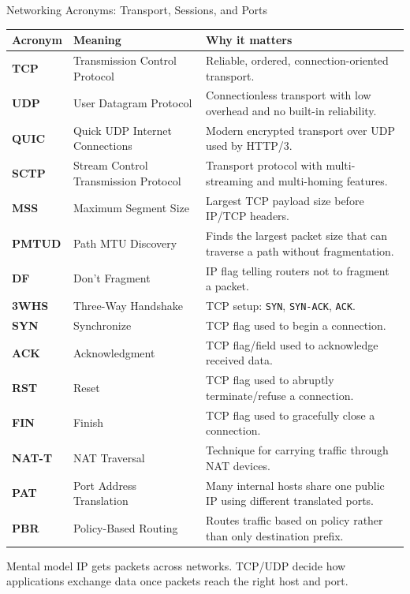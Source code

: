 \documentclass[aspectratio=169]{beamer}
\begin{document}
\begin{frame}{Networking Acronyms: Transport, Sessions, and Ports}
\tiny

\begin{tabular}{p{1.8cm} p{3.7cm} p{6.7cm}}
\toprule
\textbf{Acronym} & \textbf{Meaning} & \textbf{Why it matters} \\
\midrule
\textbf{TCP} & Transmission Control Protocol & Reliable, ordered, connection-oriented transport. \\
\textbf{UDP} & User Datagram Protocol & Connectionless transport with low overhead and no built-in reliability. \\
\textbf{QUIC} & Quick UDP Internet Connections & Modern encrypted transport over UDP used by HTTP/3. \\
\textbf{SCTP} & Stream Control Transmission Protocol & Transport protocol with multi-streaming and multi-homing features. \\
\textbf{MSS} & Maximum Segment Size & Largest TCP payload size before IP/TCP headers. \\
\textbf{PMTUD} & Path MTU Discovery & Finds the largest packet size that can traverse a path without fragmentation. \\
\textbf{DF} & Don't Fragment & IP flag telling routers not to fragment a packet. \\
\textbf{3WHS} & Three-Way Handshake & TCP setup: \texttt{SYN}, \texttt{SYN-ACK}, \texttt{ACK}. \\
\textbf{SYN} & Synchronize & TCP flag used to begin a connection. \\
\textbf{ACK} & Acknowledgment & TCP flag/field used to acknowledge received data. \\
\textbf{RST} & Reset & TCP flag used to abruptly terminate/refuse a connection. \\
\textbf{FIN} & Finish & TCP flag used to gracefully close a connection. \\
\textbf{NAT-T} & NAT Traversal & Technique for carrying traffic through NAT devices. \\
\textbf{PAT} & Port Address Translation & Many internal hosts share one public IP using different translated ports. \\
\textbf{PBR} & Policy-Based Routing & Routes traffic based on policy rather than only destination prefix. \\
\bottomrule
\end{tabular}

\vspace{0.12cm}

\begin{block}{Mental model}
IP gets packets across networks. TCP/UDP decide how applications exchange data once packets reach the right host and port.
\end{block}

\end{frame}
\end{document}
